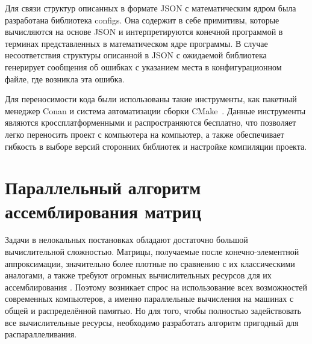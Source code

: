 Для связи структур описанных в формате JSON с математическим ядром была разработана библиотека configs. Она содержит в себе примитивы, которые вычисляются на основе JSON и интерпретируются конечной программой в терминах представленных в математическом ядре программы. В случае несоответствия структуры описанной в JSON с ожидаемой библиотека генерирует сообщения об ошибках с указанием места в конфигурационном файле, где возникла эта ошибка.

Для переносимости кода были использованы такие инструменты, как пакетный менеджер Conan \cite{Conan} и система автоматизации сборки \mbox{CMake \cite{CMake}.} Данные инструменты являются кроссплатформенными и распространяются бесплатно, что позволяет легко переносить проект с компьютера на компьютер, а также обеспечивает гибкость в выборе версий сторонних библиотек и настройке компиляции \mbox{проекта.}

\section{Параллельный алгоритм ассемблирования матриц}\label{sec:ProgramComplex/ParallelAlgorithm}

Задачи в нелокальных постановках обладают достаточно большой вычислительной сложностью. Матрицы, получаемые после конечно-элементной аппроксимации, значительно более плотные по сравнению с их классическими аналогами, а также требуют огромных вычислительных ресурсов для их ассемблирования \cite{AMCSM2019}. Поэтому возникает спрос на использование всех возможностей современных компьютеров, а именно параллельные вычисления на машинах с общей и распределённой памятью. Но для того, чтобы полностью задействовать все вычислительные ресурсы, необходимо разработать алгоритм пригодный для распараллеливания.

